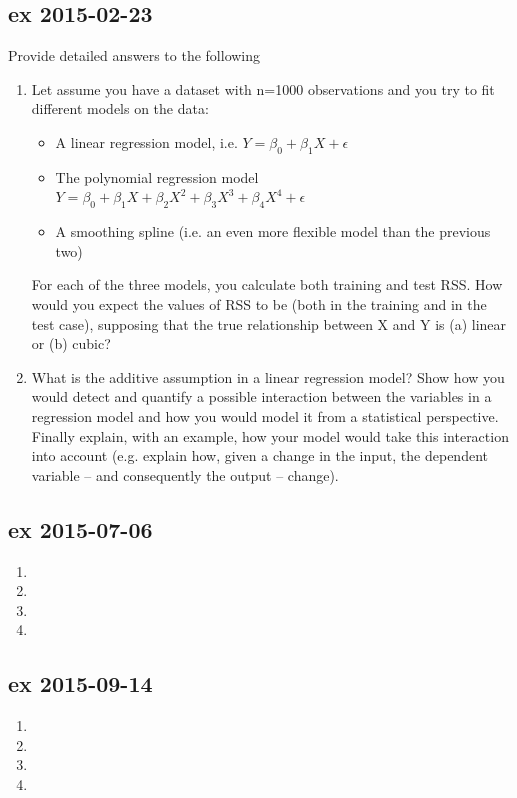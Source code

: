 \documentclass[a4paper,12pt,titlepage]{article} %
\begin{document}
\subsection{ex 2015-02-23}
Provide detailed answers to the following
\begin{enumerate}
\item Let assume you have a dataset with n=1000 observations and you try to fit different
  models on the data:
  \begin{itemize}
\item A linear regression model, i.e. $ Y = \beta_{0} + \beta_{1} X + \epsilon $
\item The polynomial regression model $ Y = \beta_{0} + \beta_{1} X + \beta_{2} X^{2} + \beta_{3} X^{3} + \beta_{4} X^{4} +  \epsilon $
\item A smoothing spline (i.e. an even more flexible model than the previous two)
  \end{itemize}
 For each of the three models, you calculate both training and test RSS. How would you expect the values of RSS to be (both in the training and in the test case), supposing that the true relationship between X and Y is (a) linear or (b) cubic?
\item What is the additive assumption in a linear regression model? Show how you would detect and quantify a possible interaction between the variables in a regression model and how you would model it from a statistical perspective. Finally explain, with an example, how your model would take this interaction into account (e.g. explain how, given a change in the input, the dependent variable – and consequently the output – change).
\end{enumerate}

\subsection{ex 2015-07-06}
\begin{enumerate}
\item
\item
\item
\item 
\end{enumerate}

\subsection{ex 2015-09-14}
\begin{enumerate}
\item
\item
\item
\item 
\end{enumerate}
\end{document}
